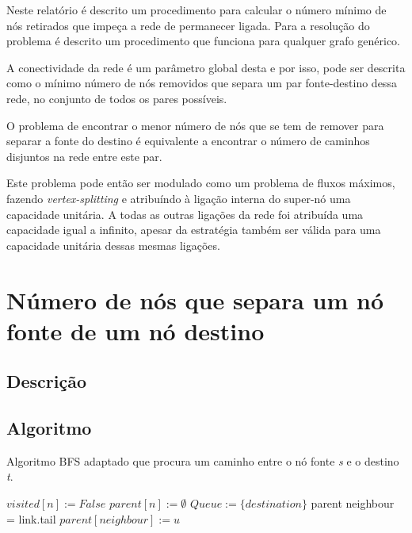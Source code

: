 \documentclass[12pt,a4paper]{scrartcl}
\begin{document}
Neste relatório é descrito um procedimento para calcular o número mínimo de nós retirados que impeça a rede de permanecer ligada. Para a resolução do problema é descrito um procedimento que funciona para qualquer grafo genérico.

A conectividade da rede é um parâmetro global desta e por isso, pode ser descrita como o mínimo número de nós removidos que separa um par fonte-destino dessa rede, no conjunto de todos os pares possíveis.

O problema de encontrar o menor número de nós que se tem de remover para separar a fonte do destino é equivalente a encontrar o número de caminhos disjuntos na rede entre este par.

Este problema pode então ser modulado como um problema de fluxos máximos, fazendo \textit{vertex-splitting} e atribuíndo à ligação interna do super-nó uma capacidade unitária. A todas as outras ligações da rede foi atribuída uma capacidade igual a infinito, apesar da estratégia também ser válida para uma capacidade unitária dessas mesmas ligações.

\section{Número de nós que separa um nó fonte de um nó destino}

\subsection{Descrição}

\subsection{Algoritmo}

\begin{algorithm}
\caption{Algoritmo BFS adaptado que procura um caminho entre o nó fonte \textit{s} e o destino \textit{t}.}\label{alg:bfs_goal}
\begin{algorithmic}[1]
    	\State $visited[n] := False $
    	\State $parent[n] := \emptyset $
    \EndFor
    \State $Queue :=  \{destination\}$
      		\Return parent 
      \EndIf
        	\State neighbour = link.tail
				\State $parent[neighbour] := u $
            \EndIf
        \EndIf
      \EndFor
  	\EndWhile
\EndProcedure
\end{algorithmic}
\end{algorithm}
\end{document}
